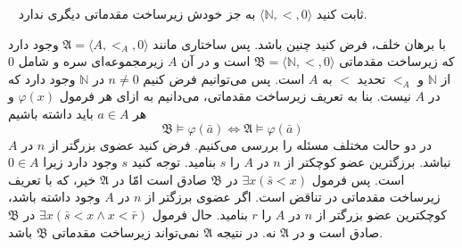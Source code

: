 ~
ثابت کنید $\langle \mathbb{N}, <, 0 \rangle$ به جز خودش زیرساخت مقدماتی دیگری ندارد.
\begin{ans}
  با برهان خلف، فرض کنید چنین باشد. پس ساختاری مانند $\mathfrak{A} = \langle A, <_A, 0 \rangle$ وجود دارد که زیرساخت مقدماتی $\mathfrak{B} = \langle \mathbb{N}, <, 0 \rangle$ است و در آن $A$ زیرمجموعه‌ای سره و شامل $0$ از $\mathbb{N}$ و $<_A$ تحدید $<$ به $A$ است. پس می‌توانیم فرض کنیم $n \neq 0$ در $\mathbb{N}$ وجود دارد که در $A$ نیست. بنا به تعریف زیرساخت مقدماتی، می‌دانیم به ازای هر فرمول $\varphi(x)$ و هر $a \in A$ باید داشته باشیم
  \[ \mathfrak{B} \vDash \varphi(\bar{a}) \iff \mathfrak{A} \vDash \varphi(\bar{a}) \]
  در دو حالت مختلف مسئله را بررسی می‌کنیم. فرض کنید عضوی بزرگتر از $n$ در $A$ نباشد. برزگترین عضو کوچکتر از $n$ در $A$ را $s$ بنامید. توجه کنید $s$ وجود دارد زیرا $0 \in A$ است. پس فرمول $\exists x (\bar{s} < x)$ در $\mathfrak{B}$ صادق است امّا در $\mathfrak{A}$ خیر، که با تعریف زیرساخت مقدماتی در تناقض است. اگر عضوی برزگتر از $n$ در $A$ وجود داشته باشد، کوچکترین عضو بزرگتر از $n$ در $A$ را $r$ بنامید. حال فرمول $\exists x (\bar{s} < x \wedge x < \bar{r})$ در $\mathfrak{B}$ صادق است و در $\mathfrak{A}$ نه. در نتیجه $\mathfrak{A}$ نمی‌تواند زیرساخت مقدماتی $\mathfrak{B}$ باشد.
\end{ans}
